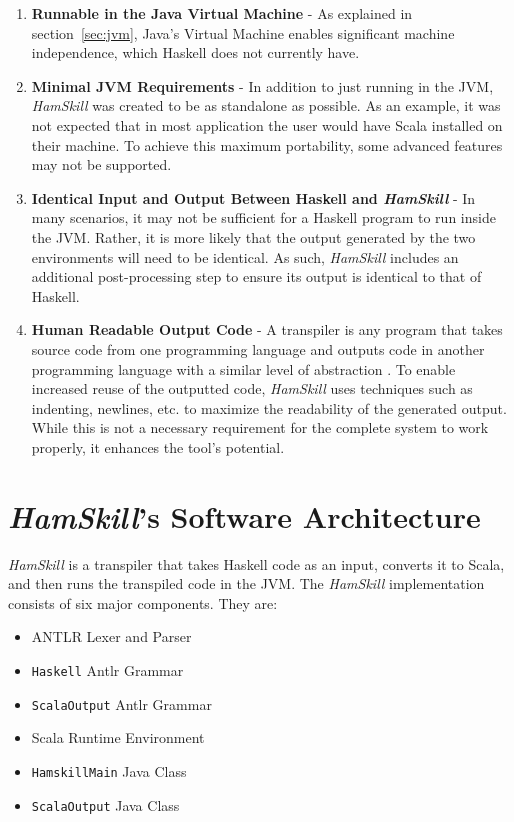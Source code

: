\documentclass{report}
\begin{document}
\begin{enumerate}

\item \textbf{Runnable in the Java Virtual Machine} - As explained in section~\ref{sec:jvm}, Java's Virtual Machine enables significant machine independence, which Haskell does not currently have.

\item \textbf{Minimal JVM Requirements} - In addition to just running in the JVM, \textit{HamSkill} was created to be as standalone as possible.  As an example, it was not expected that in most application the user would have Scala installed on their machine.  To achieve this maximum portability, some advanced features may not be supported.

\item \textbf{Identical Input and Output Between Haskell and \emph{HamSkill}} - In many scenarios, it may not be sufficient for a Haskell program to run inside the JVM.  Rather, it is more likely that the output generated by the two environments will need to be identical.  As such, \emph{HamSkill} includes an additional post-processing step to ensure its output is identical to that of Haskell.

\item \textbf{Human Readable Output Code} - A transpiler is any program that takes source code from one programming language and outputs code in another programming language with a similar level of abstraction \cite{jansen_2015}.  To enable increased reuse of the outputted code, \textit{HamSkill} uses techniques such as indenting, newlines, etc. to maximize the readability of the generated output.  While this is not a necessary requirement for the complete system to work properly, it enhances the tool's potential.

\end{enumerate}

\section{\textit{HamSkill}'s Software Architecture}\label{sec:hamskillSoftwareArchitecture}

\emph{HamSkill} is a transpiler that takes Haskell code as an input, converts it to Scala, and then runs the transpiled code in the JVM.  The \emph{HamSkill} implementation consists of six major components.  They are:

\begin{itemize}
   \item ANTLR Lexer and Parser
   \item \texttt{Haskell} Antlr Grammar
   \item \texttt{ScalaOutput} Antlr Grammar
   \item Scala Runtime Environment
   \item \texttt{HamskillMain} Java Class
   \item \texttt{ScalaOutput} Java Class
\end{itemize}
\end{document}
